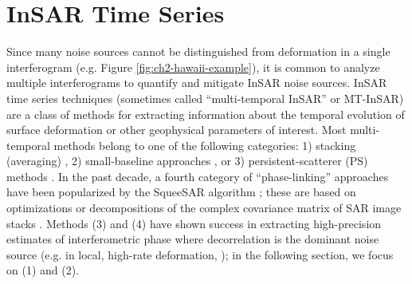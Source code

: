 %




\section{InSAR Time Series}
\label{sec:ch2-insar-ts}

Since many noise sources cannot be distinguished from deformation in a single interferogram (e.g. Figure \ref{fig:ch2-hawaii-example}), it is common to analyze multiple interferograms to quantify and mitigate InSAR noise sources.
InSAR time series techniques (sometimes called ``multi-temporal InSAR'' or MT-InSAR) are a class of methods for extracting information about the temporal evolution of surface deformation or other geophysical parameters of interest.  Most multi-temporal methods belong to one of the following categories: 1) stacking (averaging) \citep{Zebker1997AtmosphericEffectsInterferometric, Sandwell1998PhaseGradientApproach}, 2) small-baseline approaches \citep{Berardino2002NewAlgorithmSurface}, or 3) persistent-scatterer (PS) methods \citep{Ferretti2001PermanentScatterersSar, Hooper2006PersistentScatterRadar}. In the past decade, a fourth category of ``phase-linking'' approaches have been popularized by the SqueeSAR algorithm \citep{Ferretti2011NewAlgorithmProcessing}; these are based on optimizations or decompositions of the complex covariance matrix of SAR image stacks \citep{Guarnieri2008ExploitationTargetStatistics, Fornaro2015CaesarApproachBased, Ansari2018EfficientHighPrecision}. Methods (3) and (4) have shown success in extracting high-precision estimates of interferometric phase where decorrelation is the dominant noise source (e.g. in local, high-rate deformation, \citep{Tebaldini2010MethodsPerformancesMulti}); in the following section, we focus on (1) and (2).


